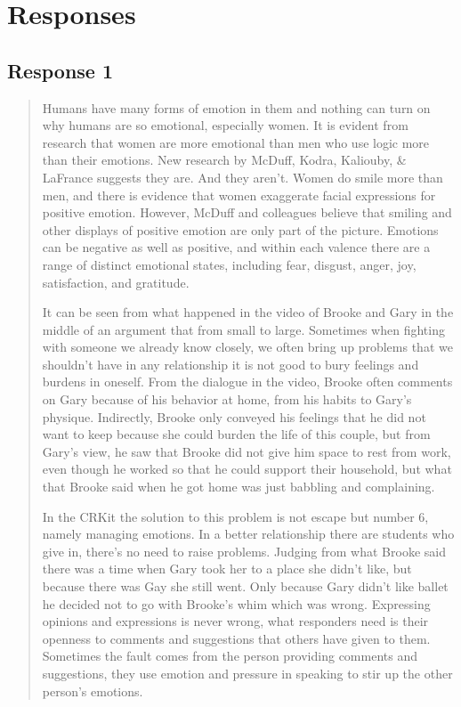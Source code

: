 
\section{Responses}
  \subsection{Response 1}
    \begin{quotation}
      Humans have many forms of emotion in them and nothing can turn on why
        humans are so emotional, especially women. It is evident from research
        that women are more emotional than men who use logic more than their
        emotions. New research by McDuff, Kodra, Kaliouby, \& LaFrance suggests
        they are. And they aren’t. Women do smile more than men, and there is
        evidence that women exaggerate facial expressions for positive emotion.
        However, McDuff and colleagues believe that smiling and other displays
        of positive emotion are only part of the picture. Emotions can be
        negative as well as positive, and within each valence there are a range
        of distinct emotional states, including fear, disgust, anger, joy,
        satisfaction, and gratitude.

      It can be seen from what happened in the video of Brooke and Gary in the
        middle of an argument that from small to large. Sometimes when fighting
        with someone we already know closely, we often bring up problems that we
        shouldn't have in any relationship it is not good to bury feelings and
        burdens in oneself. From the dialogue in the video, Brooke often
        comments on Gary because of his behavior at home, from his habits to
        Gary's physique. Indirectly, Brooke only conveyed his feelings that he
        did not want to keep because she could burden the life of this couple,
        but from Gary's view, he saw that Brooke did not give him space to rest
        from work, even though he worked so that he could support their
        household, but what that Brooke said when he got home was just babbling
        and complaining.

      In the CRKit the solution to this problem is not escape but number 6,
        namely managing emotions. In a better relationship there are students
        who give in, there's no need to raise problems. Judging from what
        Brooke said there was a time when Gary took her to a place she didn't
        like, but because there was Gay she still went. Only because Gary didn't
        like ballet he decided not to go with Brooke's whim which was wrong.
        Expressing opinions and expressions is never wrong, what responders
        need is their openness to comments and suggestions that others have
        given to them. Sometimes the fault comes from the person providing
        comments and suggestions, they use emotion and pressure in speaking to
        stir up the other person's emotions.
    \end{quotation}

